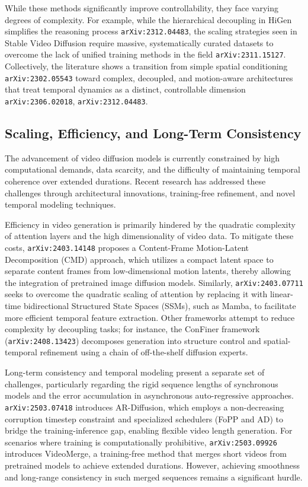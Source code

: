 \documentclass[11pt]{article}
\begin{document}
While these methods significantly improve controllability, they face varying degrees of complexity. For example, while the hierarchical decoupling in HiGen simplifies the reasoning process \texttt{arXiv:2312.04483}, the scaling strategies seen in Stable Video Diffusion require massive, systematically curated datasets to overcome the lack of unified training methods in the field \texttt{arXiv:2311.15127}. Collectively, the literature shows a transition from simple spatial conditioning \texttt{arXiv:2302.05543} toward complex, decoupled, and motion-aware architectures that treat temporal dynamics as a distinct, controllable dimension \texttt{arXiv:2306.02018}, \texttt{arXiv:2312.04483}.

\subsection{Scaling, Efficiency, and Long-Term Consistency}

The advancement of video diffusion models is currently constrained by high computational demands, data scarcity, and the difficulty of maintaining temporal coherence over extended durations. Recent research has addressed these challenges through architectural innovations, training-free refinement, and novel temporal modeling techniques.

Efficiency in video generation is primarily hindered by the quadratic complexity of attention layers and the high dimensionality of video data. To mitigate these costs, \texttt{arXiv:2403.14148} proposes a Content-Frame Motion-Latent Decomposition (CMD) approach, which utilizes a compact latent space to separate content frames from low-dimensional motion latents, thereby allowing the integration of pretrained image diffusion models. Similarly, \texttt{arXiv:2403.07711} seeks to overcome the quadratic scaling of attention by replacing it with linear-time bidirectional Structured State Spaces (SSMs), such as Mamba, to facilitate more efficient temporal feature extraction. Other frameworks attempt to reduce complexity by decoupling tasks; for instance, the ConFiner framework (\texttt{arXiv:2408.13423}) decomposes generation into structure control and spatial-temporal refinement using a chain of off-the-shelf diffusion experts.

Long-term consistency and temporal modeling present a separate set of challenges, particularly regarding the rigid sequence lengths of synchronous models and the error accumulation in asynchronous auto-regressive approaches. \texttt{arXiv:2503.07418} introduces AR-Diffusion, which employs a non-decreasing corruption timestep constraint and specialized schedulers (FoPP and AD) to bridge the training-inference gap, enabling flexible video length generation. For scenarios where training is computationally prohibitive, \texttt{arXiv:2503.09926} introduces VideoMerge, a training-free method that merges short videos from pretrained models to achieve extended durations. However, achieving smoothness and long-range consistency in such merged sequences remains a significant hurdle.
\end{document}

